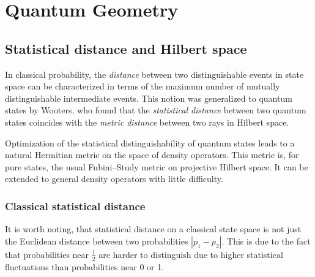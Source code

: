 \chapter{Quantum Geometry}
\label{chap:quantumGeometry}

\section{Statistical distance and Hilbert space}
\label{sec:statisticalDistance}
%


In classical probability, the \emph{distance} between two distinguishable 
events in state space can be characterized in terms of the maximum number
of mutually distinguishable intermediate events.  This notion was 
generalized to quantum states by Wooters\cite{Wooters:81}, who found
that the \emph{statistical distance} between two quantum states coincides with
the \emph{metric distance} between two rays in Hilbert space.

Optimization of the statistical distinguishability of quantum
states leads to a natural Hermitian metric on the space of density
operators\cite{Braunstein/Caves:94}.  This metric is, for pure states,
the usual Fubini--Study metric on projective Hilbert space\cite{Gibbons:92}.
It can be extended to general density operators with little difficulty.

\subsection{Classical statistical distance}


It is worth noting, that statistical distance on a classical state space 
is not just the Euclidean distance between two probabilities $|p_1-p_2|$.  
This is due to the fact that probabilities near $\frac{1}{2}$ are harder 
to distinguish due to higher statistical fluctuations than probabilities 
near 0 or 1.

